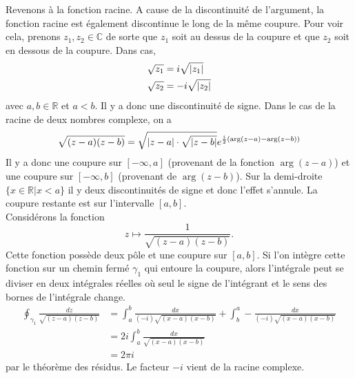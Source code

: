 \documentclass[a4paper,11pt]{report}
\theoremstyle{definition}
\theoremstyle{plain}
\theoremstyle{definition}
\theoremstyle{remark}
\begin{document}
            
            Revenons à la fonction racine. A cause de la discontinuité de l'argument, la fonction racine est également discontinue le long de la même coupure. Pour voir cela, prenons $z_1,z_2\in\mathbb{C}$ de sorte que $z_1$ soit au dessus de la coupure et que $z_2$ soit en dessous de la coupure. Dans cas,
            \begin{align}
                \sqrt{z_1} &= i\sqrt{\abs{z_1}}\\
                \sqrt{z_2} &= -i\sqrt{\abs{z_2}}
            \end{align}
            avec $a,b\in\mathbb{R}$ et $a<b$. Il y a donc une discontinuité de signe. Dans le cas de la racine de deux nombres complexe, on a 
            \begin{equation}
                \sqrt{(z-a)(z-b)} = \sqrt{\abs{z-a}\cdot\sqrt{\abs{z-b}}}e^{\frac{i}{2}\left( \arg(z-a)-\arg(z-b) \right)}
            \end{equation}
            Il y a donc une coupure sur $[-\infty,a]$ (provenant de la fonction $\arg(z-a)$) et une coupure sur $[-\infty,b]$ (provenant de $\arg(z-b)$). Sur la demi-droite $\{x\in\mathbb{R}|x<a\}$ il y deux discontinuités de signe et donc l'effet s'annule. La coupure restante est sur l'intervalle $[a,b]$.\\
            
            Considérons la fonction
            \begin{equation*}
                z\mapsto \frac{1}{\sqrt{\left( z-a \right)\left( z-b \right)}}.
            \end{equation*}
            Cette fonction possède deux pôle et une coupure sur $[a,b]$. Si l'on intègre cette fonction sur un chemin fermé $\gamma_1$ qui entoure la coupure, alors l'intégrale peut se diviser en deux intégrales réelles où seul le signe de l'intégrant et le sens des bornes de l'intégrale change.
            \begin{align}
                \oint_{\gamma_1}\frac{dz}{\sqrt{\left( z-a \right)\left( z-b \right)}} &= \int_a^b \frac{dx}{(-i)\sqrt{\left( x-a \right)\left( x-b \right)}}+\int_b^a -\frac{dx}{(-i)\sqrt{\left( x-a \right)\left( x-b \right)}}\\
                &= 2i\int_a^b \frac{dx}{\sqrt{\left( x-a \right)\left( x-b \right)}}\\
                &= 2\pi i
            \end{align}
            par le théorème des résidus. Le facteur $-i$ vient de la racine complexe.\\
            
\end{document}
